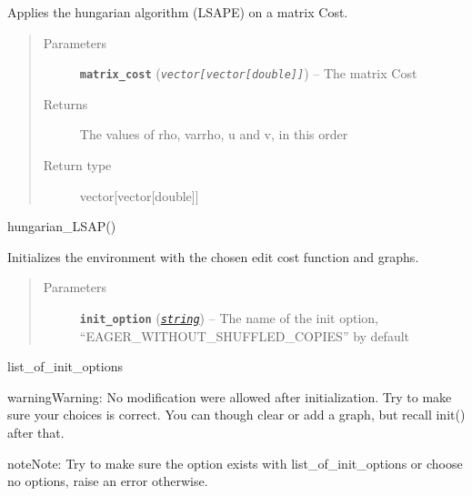 \documentclass[letterpaper,10pt,english]{sphinxmanual}
\begin{document}
\begin{fulllineitems}
\label{doc:gedlibpy.hungarian_LSAPE}
Applies the hungarian algorithm (LSAPE) on a matrix Cost.
\begin{quote}\begin{description}
\item[{Parameters}] \leavevmode
\textbf{\texttt{matrix\_cost}} (\emph{\texttt{vector{[}vector{[}double{]}{]}}}) -- The matrix Cost

\item[{Returns}] \leavevmode
The values of rho, varrho, u and v, in this order

\item[{Return type}] \leavevmode
vector{[}vector{[}double{]}{]}

\end{description}\end{quote}




hungarian\_LSAP()



\end{fulllineitems}


\begin{fulllineitems}
\label{doc:gedlibpy.init}
Initializes the environment with the chosen edit cost function and graphs.
\begin{quote}\begin{description}
\item[{Parameters}] \leavevmode
\textbf{\texttt{init\_option}} (\href{https://docs.python.org/3/library/string.html\#module-string}{\emph{\texttt{string}}}) -- The name of the init option, ``EAGER\_WITHOUT\_SHUFFLED\_COPIES'' by default

\end{description}\end{quote}




list\_of\_init\_options



\begin{notice}{warning}{Warning:}
No modification were allowed after initialization. Try to make sure your choices is correct. You can though clear or add a graph, but recall init() after that.
\end{notice}

\begin{notice}{note}{Note:}
Try to make sure the option exists with list\_of\_init\_options or choose no options, raise an error otherwise.
\end{notice}

\end{fulllineitems}
\end{document}
